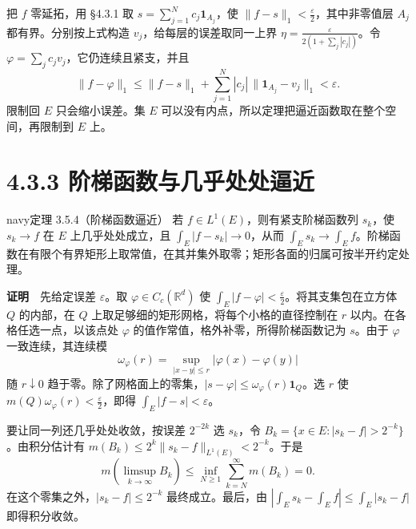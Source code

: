 \documentclass[11pt,a4paper]{article}
\begin{document}
把 \(f\) 零延拓，用 §4.3.1 取 \(s=\sum_{j=1}^{N}c_j\mathbf1_{A_j}\)，使
\(\|f-s\|_1<\frac{\varepsilon}{2}\)，其中非零值层 \(A_j\)
都有界。分别按上式构造 \(v_j\)，给每层的误差取同一上界
\(\eta=\frac{\varepsilon}{2(1+\sum_j|c_j|)}\)。令
\(\varphi=\sum_jc_jv_j\)，它仍连续且紧支，并且 \begin{equation*}
\|f-\varphi\|_1\le\|f-s\|_1+
\sum_{j=1}^{N}|c_j|\,\|\mathbf1_{A_j}-v_j\|_1<\varepsilon .
\end{equation*} 限制回 \(E\) 只会缩小误差。集 \(E\)
可以没有内点，所以定理把逼近函数取在整个空间，再限制到 \(E\) 上。

\section[\S{}4.3.3
阶梯函数与几乎处处逼近]{4.3.3
阶梯函数与几乎处处逼近}\label{ux9636ux68afux51fdux6570ux4e0eux51e0ux4e4eux5904ux5904ux903cux8fd1}

\begin{sboxenv}{navy}{定理 3.5.4（阶梯函数逼近）}
若 \(f\in L^1(E)\)，则有紧支阶梯函数列 \(s_k\)，使 \(s_k\to f\) 在 \(E\)
上几乎处处成立，且 \(\int_E|f-s_k|\to0\)，从而
\(\int_Es_k\to\int_E f\)。阶梯函数在有限个有界矩形上取常值，在其并集外取零；矩形各面的归属可按半开约定处理。

\end{sboxenv}

\textbf{证明}　先给定误差 \(\varepsilon\)。取
\(\varphi\in C_c(\mathbb R^d)\) 使
\(\int_E|f-\varphi|<\frac{\varepsilon}{2}\)。将其支集包在立方体 \(Q\)
的内部，在 \(Q\) 上取足够细的矩形网格，将每个小格的直径控制在 \(r\)
以内。在各格任选一点，以该点处 \(\varphi\)
的值作常值，格外补零，所得阶梯函数记为 \(s\)。由于 \(\varphi\)
一致连续，其连续模 \begin{equation*}
\omega_\varphi(r)=\sup_{|x-y|\le r}|\varphi(x)-\varphi(y)|
\end{equation*} 随 \(r\downarrow0\)
趋于零。除了网格面上的零集，\(|s-\varphi|\le\omega_\varphi(r)\mathbf1_Q\)。选
\(r\) 使 \(m(Q)\omega_\varphi(r)<\frac{\varepsilon}{2}\)，即得
\(\int_E|f-s|<\varepsilon\)。

要让同一列还几乎处处收敛，按误差 \(2^{-2k}\) 选 \(s_k\)，令
\(B_k=\{x\in E:|s_k-f|>2^{-k}\}\)。由积分估计有
\(m(B_k)\le2^k\|s_k-f\|_{L^1(E)}<2^{-k}\)。于是 \begin{equation*}
m\!\left(\limsup_{k\to\infty}B_k\right)
\le\inf_{N\ge1}\sum_{k=N}^{\infty}m(B_k)=0 .
\end{equation*} 在这个零集之外，\(|s_k-f|\le2^{-k}\) 最终成立。最后，由
\(|\int_Es_k-\int_E f|\le\int_E|s_k-f|\) 即得积分收敛。
\end{document}
